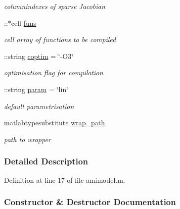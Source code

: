 \begin{DoxyCompactItemize}
\begin{DoxyCompactList}\small\item\em columnindexes of sparse Jacobian \end{DoxyCompactList}\item 
\hypertarget{classamimodel_af80b2560853c3df2b09fef2a198cf5b8}{}\+::$\ast$cell \hyperlink{classamimodel_af80b2560853c3df2b09fef2a198cf5b8}{funs}\label{classamimodel_af80b2560853c3df2b09fef2a198cf5b8}

\begin{DoxyCompactList}\small\item\em cell array of functions to be compiled \end{DoxyCompactList}\item 
\+::string \hyperlink{classamimodel_ad99abcd270ac97546c46292ebc6c2e0a}{coptim} = \char`\"{}-\/O3\char`\"{}
\begin{DoxyCompactList}\small\item\em optimisation flag for compilation \end{DoxyCompactList}\item 
\+::string \hyperlink{classamimodel_a51f20d6b1b54a2eee3be0e8adc96a0ae}{param} = \char`\"{}lin\char`\"{}
\begin{DoxyCompactList}\small\item\em default parametrisation \end{DoxyCompactList}\item 
\hypertarget{classamimodel_a0b316a20054ba282555674d939a82406}{}matlabtypesubstitute \hyperlink{classamimodel_a0b316a20054ba282555674d939a82406}{wrap\+\_\+path}\label{classamimodel_a0b316a20054ba282555674d939a82406}

\begin{DoxyCompactList}\small\item\em path to wrapper \end{DoxyCompactList}\end{DoxyCompactItemize}


\subsubsection{Detailed Description}


Definition at line 17 of file amimodel.\+m.



\subsubsection{Constructor \& Destructor Documentation}
\hypertarget{classamimodel_a05d52506788717b3d482845748446a60}{}
